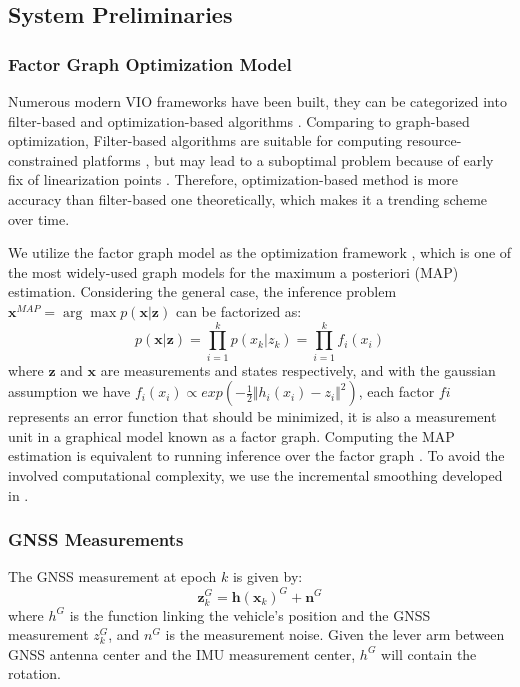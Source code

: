 \documentclass[journal,article,submit,moreauthors,pdftex]{Definitions/mdpi}
\begin{document}
\subsection{System Preliminaries}
\subsubsection{Factor Graph Optimization Model}
Numerous modern VIO frameworks have been built, they can be categorized into 
filter-based \cite{tanskanenSemidirectEKFbasedMonocular2015,Bloesch2017Iterated,
liHighprecisionConsistentEKFbased2013} and optimization-based algorithms 
\cite{qinVINSMonoRobustVersatile2017,leuteneggerKeyframeBasedVisualInertialSLAM2013,
mur-artalVisualInertialMonocularSLAM2017a}. 
Comparing to graph-based optimization, Filter-based algorithms are suitable for 
computing resource-constrained platforms \cite{huangOnlineInitializationExtrinsic2020}, 
but may lead to a suboptimal problem because of early fix of linearization
points \cite{yangMonocularVisualInertial2017}. 
Therefore, optimization-based method is more accuracy than filter-based one 
theoretically, which makes it a trending scheme over time. 

We utilize the factor graph model as the optimization framework 
\cite{loeligerIntroductionFactorGraphs2008,dellaertFactorGraphsRobot2017}, 
which is one of the most widely-used graph models for the maximum a 
posteriori (MAP) estimation. 
Considering the general case, the inference problem $\boldsymbol{x}^{MAP} = \arg\max p(\boldsymbol{x|z})$ can be factorized as:
\begin{equation}
	p(\boldsymbol{x|z}) = \prod_{i=1}^{k} p(x_{k}|z_{k}) = \prod_{i=1}^{k} f_i(x_i)
\end{equation}
where $\boldsymbol{z}$ and $\boldsymbol{x}$ are measurements and 
states respectively, and with the gaussian assumption we have $f_i(x_i) \propto exp \left( -\frac{1}{2}\Vert h_i(x_i) -z_i \Vert^2 \right)$, each factor $fi$ represents an error function that should be minimized, it is also a measurement unit in a graphical model known as a factor graph. 
Computing the MAP estimation is equivalent to running inference 
over the factor graph \cite{indelmanInformationFusionNavigation2013}. 
To avoid the involved computational complexity, we use the incremental 
smoothing developed in \cite{kaessISAM2IncrementalSmoothing2012}.

\subsubsection{GNSS Measurements}
The GNSS measurement at epoch $k$ is given by:
\begin{equation}
	\boldsymbol{z}_k^G = \boldsymbol{h}(\boldsymbol{x}_k)^G+\boldsymbol{n}^G
\end{equation}
where $h^G$ is the function linking the vehicle's position and the 
GNSS measurement $z^G_k$, and $n^G$ is the measurement noise. 
Given the lever arm between GNSS antenna center and  the IMU measurement 
center, $h^G$ will contain the rotation\cite{farrellAidedNavigationGPS2008}. 
\end{document}
